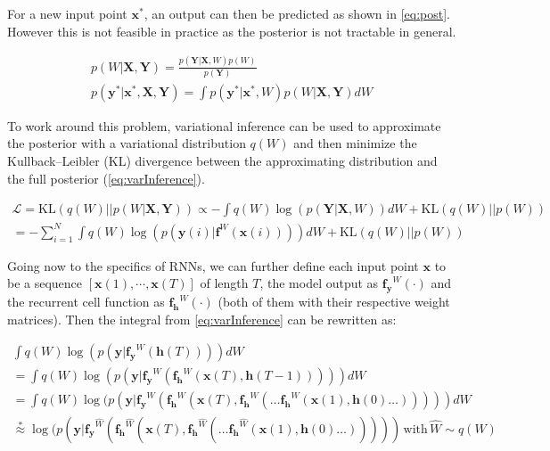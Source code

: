 For a new input point $\mathbf{x^*}$, an output can then be predicted as shown in \autoref{eq:post}. However this is not feasible in practice as the posterior is not tractable in general. 

\begin{equation} \label{eq:post}
\begin{gathered}
	p(W | \mathbf{X}, \mathbf{Y}) = \frac{ p(\mathbf{Y} | \mathbf{X}, W) p(W) }{ p( \mathbf{Y} ) } \\
	p(\mathbf{y^*} | \mathbf{x^*}, \mathbf{X}, \mathbf{Y}) = \int p(\mathbf{y^*} | \mathbf{x^*}, W) p(W | \mathbf{X}, \mathbf{Y}) dW
\end{gathered}
\end{equation}

To work around this problem, variational inference can be used to approximate the posterior with a variational distribution $q(W)$ and then
minimize the Kullback–Leibler (KL) divergence between the approximating distribution and the full posterior (\autoref{eq:varInference}). 

\begin{equation} \label{eq:varInference}
\begin{gathered}
	\mathcal{L}=\text{KL}(q(W)||p(W | \mathbf{X}, \mathbf{Y})) \propto - \int q(W) \log(p(\mathbf{Y} | \mathbf{X}, W))dW + \text{KL}(q(W)||p(W))\\
	= - \sum_{i=1}^{N} \int q(W) \log(p(\mathbf{y}(i) | \mathbf{f}^W(\mathbf{x}(i))))dW + \text{KL}(q(W)||p(W))
\end{gathered}
\end{equation}

Going now to the specifics of RNNs, we can further define each input point $\mathbf{x}$ to be a sequence $[\mathbf{x}(1),\cdots,\mathbf{x}(T)]$ of length $T$, the model output as $\mathbf{f_y}^W(\cdot)$ and the recurrent cell function as $\mathbf{f_h}^W(\cdot)$ (both of them with their respective weight matrices). Then the integral from \autoref{eq:varInference} can be rewritten as:

\begin{equation} \label{eq:approximation}
\begin{gathered}
	\int q(W) \log(p(\mathbf{y} | \mathbf{f_y}^W(\mathbf{h}(T))))dW \\ 
	= \int q(W) \log(p(\mathbf{y} | \mathbf{f_y}^W(\mathbf{f_h}^W(\mathbf{x}(T),\mathbf{h}(T-1)))))dW \\
	= \int q(W) \log(p(\mathbf{y} | \mathbf{f_y}^W(\mathbf{f_h}^W(\mathbf{x}(T),\mathbf{f_h}^W(\ldots\mathbf{f_h}^W(\mathbf{x}(1),\mathbf{h}(0)\ldots)))))dW \\
	\stackrel{*}{\approx} \log(p(\mathbf{y}| \mathbf{f_y}^{\hat{W}}(\mathbf{f_h}^{\hat{W}}(\mathbf{x}(T),\mathbf{f_h}^{\hat{W}}(\ldots\mathbf{f_h}^{\hat{W}}(\mathbf{x}(1),\mathbf{h}(0)\ldots))))) \, \text{with} \, \hat{W} \sim q(W)
\end{gathered}
\end{equation}

